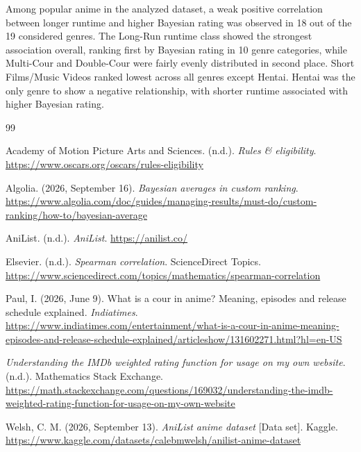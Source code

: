 \documentclass{article}
\begin{document}
Among popular anime in the analyzed dataset, a weak positive correlation between longer runtime and higher Bayesian rating was observed in 18 out of the 19 considered genres. 
The Long-Run runtime class showed the strongest association overall, ranking first by Bayesian rating in 10 genre categories, while Multi-Cour and Double-Cour were fairly evenly distributed in second place. 
Short Films/Music Videos ranked lowest across all genres except Hentai. 
Hentai was the only genre to show a negative relationship, with shorter runtime associated with higher Bayesian rating.






\begin{thebibliography}{99} 

Academy of Motion Picture Arts and Sciences. (n.d.). 
\textit{Rules \& eligibility}. 
\url{https://www.oscars.org/oscars/rules-eligibility} 

Algolia. (2026, September 16). 
\textit{Bayesian averages in custom ranking}. 
\url{https://www.algolia.com/doc/guides/managing-results/must-do/custom-ranking/how-to/bayesian-average} 

AniList. (n.d.). 
\textit{AniList}. 
\url{https://anilist.co/} 

Elsevier. (n.d.). 
\textit{Spearman correlation}. 
ScienceDirect Topics. 
\url{https://www.sciencedirect.com/topics/mathematics/spearman-correlation} 

Paul, I. (2026, June 9). 
What is a cour in anime? Meaning, episodes and release schedule explained. 
\textit{Indiatimes}. 
\url{https://www.indiatimes.com/entertainment/what-is-a-cour-in-anime-meaning-episodes-and-release-schedule-explained/articleshow/131602271.html?hl=en-US} 

\textit{Understanding the IMDb weighted rating function for usage on my own website}. 
(n.d.). 
Mathematics Stack Exchange. 
\url{https://math.stackexchange.com/questions/169032/understanding-the-imdb-weighted-rating-function-for-usage-on-my-own-website} 

Welsh, C. M. (2026, September 13). 
\textit{AniList anime dataset} [Data set]. 
Kaggle. 
\url{https://www.kaggle.com/datasets/calebmwelsh/anilist-anime-dataset} 

\end{thebibliography}
\end{document}
